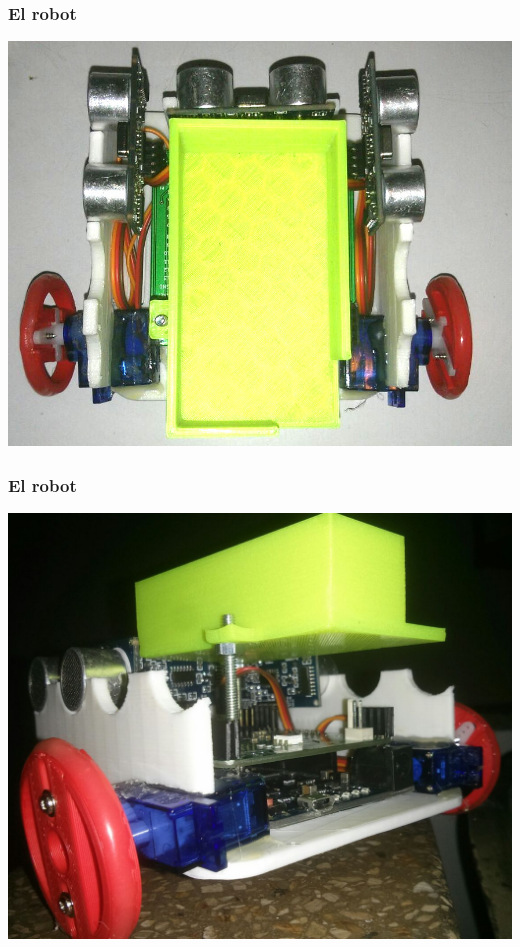 \documentclass[compress]{beamer}
\begin{document}
\begin{frame}
 \frametitle{El robot}
 \begin{center}
 \includegraphics[height=0.8\textheight]{./img/dreamster-top.jpg} 
 \end{center}
\end{frame}

\begin{frame}
 \frametitle{El robot}
 \begin{center}
 \includegraphics[height=0.8\textheight]{./img/dreamster-back.jpg} 
 \end{center}
\end{frame}
\end{document}
